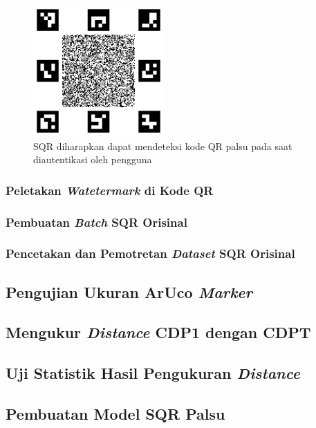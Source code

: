 \begin{figure}[h]
	\centering
	\includegraphics[width=5cm]{contents/chapter-3/3-cdpdenganaruco.png}
	\caption{SQR diharapkan dapat mendeteksi kode QR palsu pada saat diautentikasi oleh pengguna \cite{picard2021counterfeit}}
	\label{Fig: 3-cdpdenganaruco}
\end{figure}

\subsubsection{Peletakan \emph{Watetermark} di Kode QR}

\subsubsection{Pembuatan \emph{Batch} SQR Orisinal}

\subsubsection{Pencetakan dan Pemotretan \emph{Dataset} SQR Orisinal}

\subsection{Pengujian Ukuran ArUco \emph{Marker}}

\subsection{Mengukur \emph{Distance} CDP1 dengan CDPT}

\subsection{Uji Statistik Hasil Pengukuran \emph{Distance}}

\subsection{Pembuatan Model SQR Palsu}

